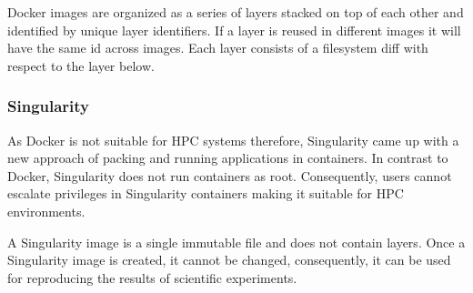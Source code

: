 \documentclass[a4paper,num-refs]{oup-contemporary}
\begin{document}
Docker images are organized as a series of layers stacked on top of each
other and identified by unique layer identifiers. If a layer is reused
in different images it will
have the same id across images. Each layer consists of a filesystem diff
with respect to the layer below.

\subsubsection{Singularity}

As Docker is not suitable for HPC systems therefore, Singularity came up with a new approach
of packing and running applications in containers. 
In contrast to Docker,
Singularity does not run containers as root. Consequently, users cannot escalate
privileges in Singularity containers making it suitable for HPC environments.

A Singularity image is a single immutable file and
does not contain layers.
Once a Singularity image is created, it cannot be changed, consequently,
it can be used for reproducing the results of scientific
experiments.
\end{document}
